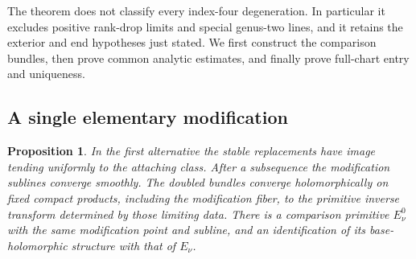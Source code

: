 \documentclass[11pt]{amsart}
\newtheorem{proposition}[theorem]{Proposition}
\theoremstyle{definition}
\theoremstyle{remark}
\theoremstyle{plain}
\begin{document}
The theorem does not classify every index-four degeneration. In
particular it excludes positive rank-drop limits and special genus-two
lines, and it retains the exterior and end hypotheses just stated.
We first construct the comparison bundles, then prove common analytic
estimates, and finally prove full-chart entry and uniqueness.

\subsection{A single elementary modification}

\begin{proposition}\label{prop:converse-one-modification}
In the first alternative the stable replacements have image tending
uniformly to the attaching class. After a subsequence the modification
sublines converge smoothly. The doubled bundles converge
holomorphically on fixed compact products, including the modification
fiber, to the primitive inverse transform determined by those limiting
data. There is a comparison primitive $E_\nu^0$ with the same modification
point and subline, and an identification of its base-holomorphic
structure with that of $E_\nu$.
\end{proposition}
\end{document}

